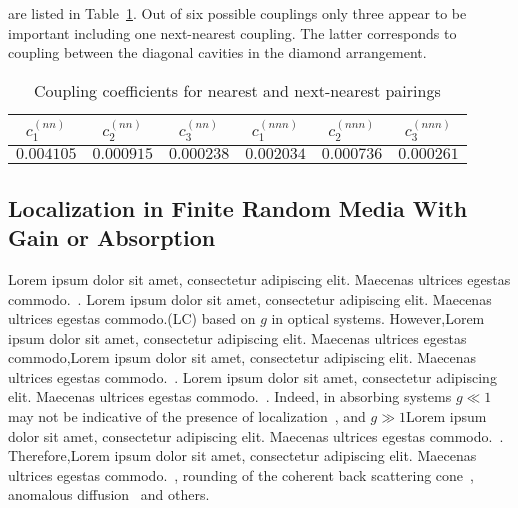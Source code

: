 are listed in Table~\ref{tab:c}. Out of six possible couplings only three appear to be important including one next-nearest coupling. The latter corresponds to coupling between the diagonal cavities in the diamond arrangement.

\begin{table}
\begin{center}
\caption{\label{tab:c}Coupling coefficients for nearest and next-nearest pairings}
\begin{tabular}{||c|c|c||c|c|c||}
\hline
$c^{(nn)}_{1}$ & $c^{(nn)}_{2}$ & $c^{(nn)}_{3}$ & $c^{(nnn)}_{1}$ & $c^{(nnn)}_{2}$ & $c^{(nnn)}_{3}$ \\ \hline
$0.004105$ & $0.000915$ & $0.000238$ & $0.002034$ & $0.000736$ & $0.000261$ \\
\hline
\end{tabular}
\end{center}
\end{table}

\subsection{Localization in Finite Random Media With Gain or Absorption}

Lorem ipsum dolor sit amet, consectetur adipiscing elit. Maecenas ultrices egestas commodo.~\cite{1988_Stone}. Lorem ipsum dolor sit amet, consectetur adipiscing elit. Maecenas ultrices egestas commodo.(LC) based on $g$ in optical systems. However,Lorem ipsum dolor sit amet, consectetur adipiscing elit. Maecenas ultrices egestas commodo,Lorem ipsum dolor sit amet, consectetur adipiscing elit. Maecenas ultrices egestas commodo.~\cite{1999_van_Tiggelen}. Lorem ipsum dolor sit amet, consectetur adipiscing elit. Maecenas ultrices egestas commodo.~\cite{1994_Freilikher_absorption}. Indeed, in absorbing systems $g\ll 1$ may not be indicative of the presence of localization~\cite{1998_Brouwer,2000_chabanov_nature}, and $g\gg 1$Lorem ipsum dolor sit amet, consectetur adipiscing elit. Maecenas ultrices egestas commodo.~\cite{2004_Yamilov_intensity,2006_Yamilov_conductance}. Therefore,Lorem ipsum dolor sit amet, consectetur adipiscing elit. Maecenas ultrices egestas commodo.~\cite{1994_Kumar,1995_Zhang,1996_Paasschens_gain,1997_Freilikher_gain,1998_Maret_PRL,2000_chabanov_nature,2006_Yamilov_conductance}, rounding of the coherent back scattering cone~\cite{1997_Wiersma_cbs,1999_Kaiser_cbs,2009_Maret}, anomalous diffusion~\cite{1989_Genack,1997_wiersma_nature,2006_Maret,2007_Segev,2008_van_Tiggelen_Nature,2009_Genack_PRB} and others.

